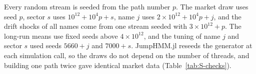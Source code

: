 Every random stream is seeded from the path number $p$. The market draw uses seed $p$, sector $s$ uses
$10^{12} + 10^4 p + s$, name $j$ uses $2 \times 10^{12} + 10^4 p + j$, and the drift shocks of all names come from
one stream seeded with $3 \times 10^{12} + p$. The long-run means use fixed seeds above $4 \times 10^{12}$, and the
tuning of name $j$ and sector $s$ used seeds $5660 + j$ and $7000 + s$. JumpHMM.jl reseeds the generator at each
simulation call, so the draws do not depend on the number of threads, and building one path twice gave identical
market data (Table~\ref{tab:S-checks}).
